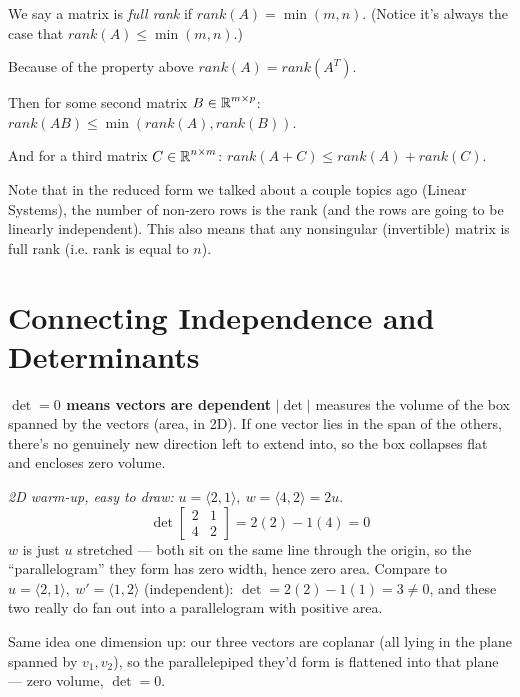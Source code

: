 We say a matrix is \emph{full rank} if $rank(A)=\min(m,n)$. (Notice it's always the case that $rank(A)\le\min(m,n)$.)

Because of the property above $rank(A) = rank(A^T)$. 

Then for some second matrix $B\in\operatorname{\mathbb{R}}^{m\times p}$: $rank(AB) \le \min(rank(A),rank(B))$. 

And for a third matrix $C\in\operatorname{\mathbb{R}}^{n\times m}$: $rank(A + C) \le rank(A) + rank(C).$

Note that in the reduced form we talked about a couple topics ago (Linear Systems), the number of non-zero rows is the rank (and the rows are going to be linearly independent). 
This also means that any nonsingular (invertible) matrix is full rank (i.e. rank is equal to $n$). 

\section{Connecting Independence and Determinants}
\textbf{$\det=0$ means vectors are dependent} $|\det|$ measures the volume of the box spanned by the vectors (area, in 2D). If one vector lies in the span of the others, there's no genuinely new direction left to extend into, so the box collapses flat and encloses zero volume.

\emph{2D warm-up, easy to draw:} $u=\langle2,1\rangle,\ w=\langle4,2\rangle=2u$.
\[
\det\begin{bmatrix}2&1\\4&2\end{bmatrix}=2(2)-1(4)=0
\]
$w$ is just $u$ stretched --- both sit on the same line through the origin, so the ``parallelogram'' they form has zero width, hence zero area. Compare to $u=\langle2,1\rangle,\ w'=\langle1,2\rangle$ (independent): $\det=2(2)-1(1)=3\ne0$, and these two really do fan out into a parallelogram with positive area.

\begin{center}
\end{center}
Same idea one dimension up: our three vectors are coplanar (all lying in the plane spanned by $v_1,v_2$), so the parallelepiped they'd form is flattened into that plane --- zero volume, $\det=0$.

